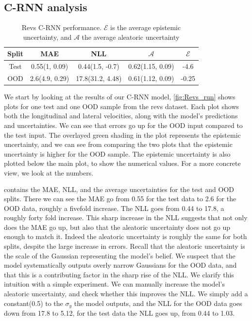 \subsection{C-RNN analysis}

\begin{table}[htbp]
\centering
    \begin{tabular}{c  c  c   c  c }  
        \toprule
        Split & MAE & NLL & $\mathcal{A}$ & $\mathcal{E}$\\
        \midrule
        Test & 0.55(1, 0.09) & 0.44(1.5, -0.7) & 0.62(1.15, 0.09) &  -4.6\\
        OOD  &  2.6(4.9, 0.29) &  17.8(31.2, 4.48) & 0.61(1.12, 0.09)&  -0.25\\
        \midrule
    \end{tabular}
    \caption[Revs C-RNN performance]{Revs C-RNN performance. $\mathcal{E}$ is the average epistemic uncertainty, and $\mathcal{A}$ the average aleatoric uncertainty}
    \label{tbl:revs}
\end{table}

We start by looking at the results of our C-RNN model, \cref{fig:Revs_run} shows plots for one test and one OOD sample from the revs dataset. Each plot shows both the longitudinal and lateral velocities, along with the model's predictions and uncertainties.
We can see that errors go up for the OOD input compared to the test input. The overlayed green shading in the plot represents the epistemic uncertainty, and we can see from comparing the two plots that the epistemic uncertainty is higher for the OOD sample. The epistemic uncertainty is also plotted below the main plot, to show the numerical values. For a more concrete view, we look at the numbers.

 contains the MAE, NLL, and the average uncertainties for the test and OOD splits. There we can see the MAE go from 0.55 for the test data to 2.6 for the OOD data, roughly a fivefold increase. The NLL goes from 0.44 to 17.8, a roughly forty fold increase. This sharp increase in the NLL suggests that not only does the MAE go up, but also that the aleatoric uncertainty does not go up enough to match it. Indeed the aleatoric uncertainty is roughly the same for both splits, despite the large increase in errors. 
Recall that the aleatoric uncertainty is the scale of the Gaussian representing the model's belief. We suspect that the model systematically outputs overly narrow Gaussians for the OOD data, and that this is a contributing factor in the sharp rise of the NLL.  
We clarify this intuition with a simple experiment. We can manually increase the model's aleatoric uncertainty, and check whether this improves the NLL. We simply add a constant(0.5) to the $\sigma_y$ the model outputs, and the NLL for the OOD data goes down from 17.8 to 5.12, for the test data the NLL goes up, from 0.44 to 1.03.

